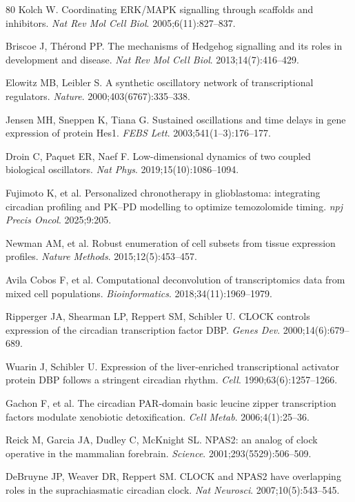 \documentclass[11pt,a4paper]{article}
\begin{document}
\begin{thebibliography}{80}
Kolch W. Coordinating ERK/MAPK signalling through scaffolds and inhibitors. \textit{Nat Rev Mol Cell Biol}. 2005;6(11):827--837.

Briscoe J, Th\'erond PP. The mechanisms of Hedgehog signalling and its roles in development and disease. \textit{Nat Rev Mol Cell Biol}. 2013;14(7):416--429.

Elowitz MB, Leibler S. A synthetic oscillatory network of transcriptional regulators. \textit{Nature}. 2000;403(6767):335--338.

Jensen MH, Sneppen K, Tiana G. Sustained oscillations and time delays in gene expression of protein Hes1. \textit{FEBS Lett}. 2003;541(1--3):176--177.

Droin C, Paquet ER, Naef F. Low-dimensional dynamics of two coupled biological oscillators. \textit{Nat Phys}. 2019;15(10):1086--1094.

Fujimoto K, et al. Personalized chronotherapy in glioblastoma: integrating circadian profiling and PK--PD modelling to optimize temozolomide timing. \textit{npj Precis Oncol}. 2025;9:205.

Newman AM, et al. Robust enumeration of cell subsets from tissue expression profiles. \textit{Nature Methods}. 2015;12(5):453--457.

Avila Cobos F, et al. Computational deconvolution of transcriptomics data from mixed cell populations. \textit{Bioinformatics}. 2018;34(11):1969--1979.

Ripperger JA, Shearman LP, Reppert SM, Schibler U. CLOCK controls expression of the circadian transcription factor DBP. \textit{Genes Dev}. 2000;14(6):679--689.

Wuarin J, Schibler U. Expression of the liver-enriched transcriptional activator protein DBP follows a stringent circadian rhythm. \textit{Cell}. 1990;63(6):1257--1266.

Gachon F, et al. The circadian PAR-domain basic leucine zipper transcription factors modulate xenobiotic detoxification. \textit{Cell Metab}. 2006;4(1):25--36.

Reick M, Garcia JA, Dudley C, McKnight SL. NPAS2: an analog of clock operative in the mammalian forebrain. \textit{Science}. 2001;293(5529):506--509.

DeBruyne JP, Weaver DR, Reppert SM. CLOCK and NPAS2 have overlapping roles in the suprachiasmatic circadian clock. \textit{Nat Neurosci}. 2007;10(5):543--545.


\end{thebibliography}
\end{document}
